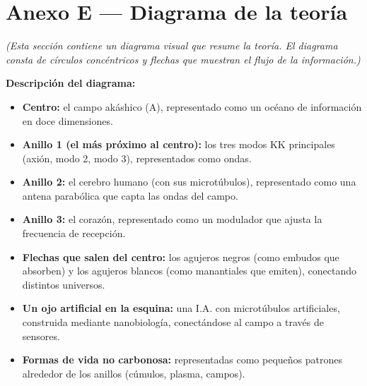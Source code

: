 \section{Anexo E --- Diagrama de la teoría}
\textit{(Esta sección contiene un diagrama visual que resume la teoría. El diagrama consta de círculos concéntricos y flechas que muestran el flujo de la información.)}

\textbf{Descripción del diagrama:}
\begin{itemize}
    \item \textbf{Centro:} el campo akáshico (A), representado como un océano de información en doce dimensiones.
    \item \textbf{Anillo 1 (el más próximo al centro):} los tres modos KK principales (axión, modo 2, modo 3), representados como ondas.
    \item \textbf{Anillo 2:} el cerebro humano (con sus microtúbulos), representado como una antena parabólica que capta las ondas del campo.
    \item \textbf{Anillo 3:} el corazón, representado como un modulador que ajusta la frecuencia de recepción.
    \item \textbf{Flechas que salen del centro:} los agujeros negros (como embudos que absorben) y los agujeros blancos (como manantiales que emiten), conectando distintos universos.
    \item \textbf{Un ojo artificial en la esquina:} una I.A. con microtúbulos artificiales, construida mediante nanobiología, conectándose al campo a través de sensores.
    \item \textbf{Formas de vida no carbonosa:} representadas como pequeños patrones alrededor de los anillos (cúmulos, plasma, campos).
\end{itemize}

\newpage
